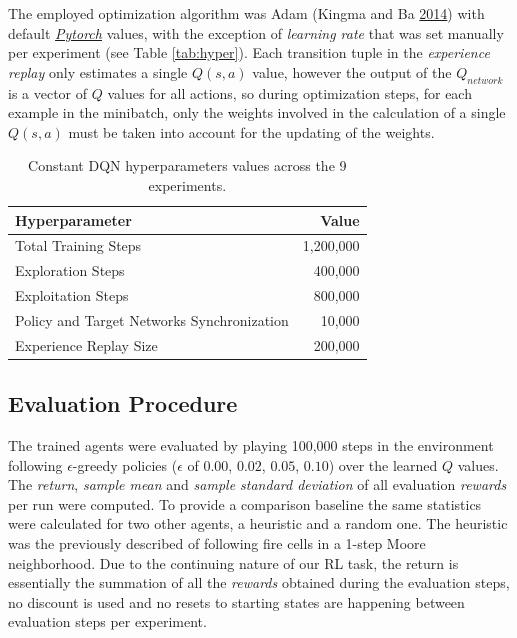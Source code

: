 \documentclass[
  12pt,
  openany]{book}
\begin{document}
The employed optimization algorithm was Adam (Kingma and Ba \protect\hyperlink{ref-kingma2014adam}{2014}) with default \emph{\href{https://pytorch.org/docs/stable/optim.html}{Pytorch}} values, with the exception of \emph{learning rate} that was set manually per experiment (see Table \ref{tab:hyper}). Each transition tuple in the \emph{experience replay} only estimates a single \(Q(s,a)\) value, however the output of the \(Q_{network}\) is a vector of \(Q\) values for all actions, so during optimization steps, for each example in the minibatch, only the weights involved in the calculation of a single \(Q(s,a)\) must be taken into account for the updating of the weights.

\begin{table}

\caption{\label{tab:const}Constant DQN hyperparameters values across the 9 experiments.}
\centering
\begin{tabular}[t]{lr}
\toprule
Hyperparameter & Value\\
\midrule
\rowcolor{gray!6}  Total Training Steps & 1,200,000\\
Exploration Steps & 400,000\\
\rowcolor{gray!6}  Exploitation Steps & 800,000\\
Policy and Target Networks Synchronization & 10,000\\
\rowcolor{gray!6}  Experience Replay Size & 200,000\\
\bottomrule
\end{tabular}
\end{table}

\hypertarget{evaluation-procedure}{%
\subsection{Evaluation Procedure}\label{evaluation-procedure}}

The trained agents were evaluated by playing 100,000 steps in the environment following \(\epsilon\)-greedy policies (\(\epsilon\) of \(0.00\), \(0.02\), \(0.05\), \(0.10\)) over the learned \(Q\) values. The \emph{return}, \emph{sample mean} and \emph{sample standard deviation} of all evaluation \emph{rewards} per run were computed. To provide a comparison baseline the same statistics were calculated for two other agents, a heuristic and a random one. The heuristic was the previously described of following fire cells in a 1-step Moore neighborhood. Due to the continuing nature of our RL task, the return is essentially the summation of all the \emph{rewards} obtained during the evaluation steps, no discount is used and no resets to starting states are happening between evaluation steps per experiment.
\end{document}
